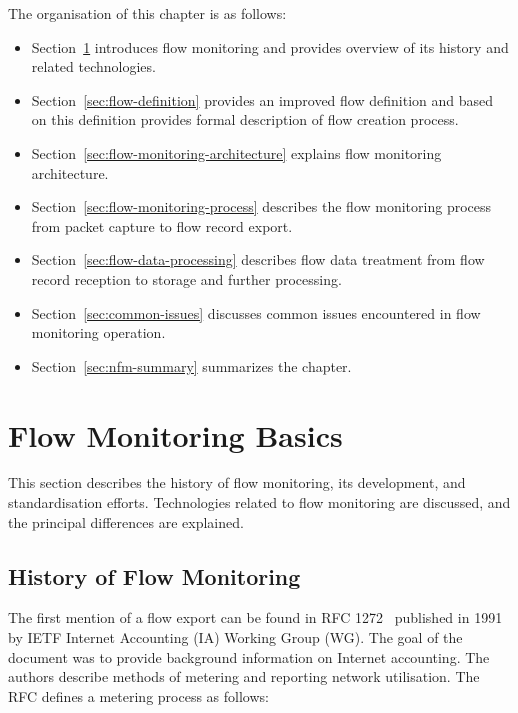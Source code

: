 \begin{chapintro}
The organisation of this chapter is as follows:
\begin{itemize}
  \item Section~\ref{sec:flow-monitoring-basics} introduces flow monitoring and provides overview of its history and related technologies.
  \item Section~\ref{sec:flow-definition} provides an improved flow definition and based on this definition provides formal description of flow creation process.
  \item Section~\ref{sec:flow-monitoring-architecture} explains flow monitoring architecture.
  \item Section~\ref{sec:flow-monitoring-process} describes the flow monitoring process from packet capture to flow record export.
  \item Section~\ref{sec:flow-data-processing} describes flow data treatment from flow record reception to storage and further processing.
  \item Section~\ref{sec:common-issues} discusses common issues encountered in flow monitoring operation.
  \item Section~\ref{sec:nfm-summary} summarizes the chapter.
\end{itemize}

\end{chapintro}

\newpage

\section{Flow Monitoring Basics}\label{sec:flow-monitoring-basics}

This section describes the history of flow monitoring, its development, and standardisation efforts. Technologies related to flow monitoring are discussed, and the principal differences are explained.

\subsection{History of Flow Monitoring}\label{subsec:history-of-flow-monitoring}

The first mention of a flow export can be found in RFC 1272~\cite{rfc1272} published in 1991 by IETF Internet Accounting (IA) Working Group (WG). The goal of the document was to provide background information on Internet accounting. The authors describe methods of metering and reporting network utilisation. The RFC defines a metering process as follows:

